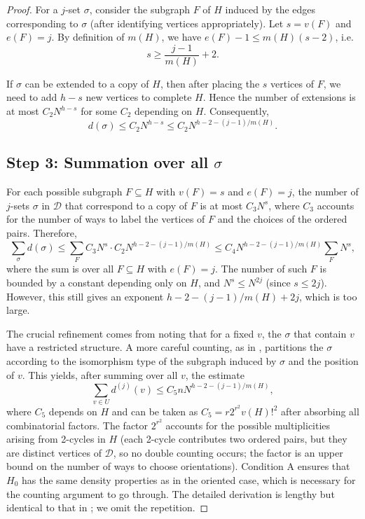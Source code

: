 \documentclass[11pt,a4paper]{article}
\newcommand{\cD}{\mathcal{D}}
\begin{document}
\begin{proof}
For a $j$-set $\sigma$, consider the subgraph $F$ of $H$ induced by the edges corresponding to $\sigma$ (after identifying vertices appropriately). Let $s=v(F)$ and $e(F)=j$. By definition of $m(H)$, we have $e(F)-1\le m(H)(s-2)$, i.e.
\[
s \ge \frac{j-1}{m(H)}+2.
\]

If $\sigma$ can be extended to a copy of $H$, then after placing the $s$ vertices of $F$, we need to add $h-s$ new vertices to complete $H$. Hence the number of extensions is at most $C_2 N^{h-s}$ for some $C_2$ depending on $H$. Consequently,
\[
d(\sigma) \le C_2 N^{h-s} \le C_2 N^{h-2-(j-1)/m(H)}.
\]

\subsection*{Step 3: Summation over all $\sigma$}
For each possible subgraph $F\subseteq H$ with $v(F)=s$ and $e(F)=j$, the number of $j$-sets $\sigma$ in $\cD$ that correspond to a copy of $F$ is at most $C_3 N^s$, where $C_3$ accounts for the number of ways to label the vertices of $F$ and the choices of the ordered pairs. Therefore,
\[
\sum_{\sigma} d(\sigma) \le \sum_{F} C_3 N^s \cdot C_2 N^{h-2-(j-1)/m(H)} \le C_4 N^{h-2-(j-1)/m(H)} \sum_{F} N^s,
\]
where the sum is over all $F\subseteq H$ with $e(F)=j$. The number of such $F$ is bounded by a constant depending only on $H$, and $N^s\le N^{2j}$ (since $s\le 2j$). However, this still gives an exponent $h-2-(j-1)/m(H)+2j$, which is too large.

The crucial refinement comes from noting that for a fixed $v$, the $\sigma$ that contain $v$ have a restricted structure. A more careful counting, as in \cite[Lemma 9.2]{SAX2015}, partitions the $\sigma$ according to the isomorphism type of the subgraph induced by $\sigma$ and the position of $v$. This yields, after summing over all $v$, the estimate
\[
\sum_{v\in U} d^{(j)}(v) \le C_5 n N^{h-2-(j-1)/m(H)}, \tag{1}
\]
where $C_5$ depends on $H$ and can be taken as $C_5 = r2^{r^2}v(H)!^2$ after absorbing all combinatorial factors. The factor $2^{r^2}$ accounts for the possible multiplicities arising from 2-cycles in $H$ (each 2-cycle contributes two ordered pairs, but they are distinct vertices of $\cD$, so no double counting occurs; the factor is an upper bound on the number of ways to choose orientations). Condition A ensures that $H_0$ has the same density properties as in the oriented case, which is necessary for the counting argument to go through. The detailed derivation is lengthy but identical to that in \cite[Lemma 9.2]{SAX2015}; we omit the repetition.


\end{proof}
\end{document}
